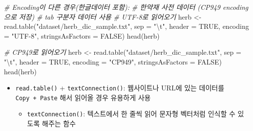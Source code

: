 \documentclass[
  11pt,
]{krantz}
\newenvironment{Shaded}{\begin{snugshade}}{\end{snugshade}}
\newcommand{\AttributeTok}[1]{\textcolor[rgb]{0.61,0.61,0.61}{#1}}
\newcommand{\CommentTok}[1]{\textcolor[rgb]{0.37,0.37,0.37}{\textit{#1}}}
\newcommand{\ConstantTok}[1]{\textcolor[rgb]{0,0,0}{#1}}
\newcommand{\FunctionTok}[1]{\textcolor[rgb]{0,0,0}{#1}}
\newcommand{\NormalTok}[1]{#1}
\newcommand{\OtherTok}[1]{\textcolor[rgb]{0.37,0.37,0.37}{#1}}
\newcommand{\SpecialCharTok}[1]{\textcolor[rgb]{0,0,0}{#1}}
\newcommand{\StringTok}[1]{\textcolor[rgb]{0.5,0.5,0.5}{#1}}
\providecommand{\tightlist}{%
  \setlength{\itemsep}{0pt}\setlength{\parskip}{0pt}}
\begin{document}
\footnotesize

\begin{Shaded}
\begin{Highlighting}[]
\CommentTok{\# Encoding이 다른 경우(한글데이터 포함): }
\CommentTok{\# 한약재 사전 데이터 (CP949 encoding으로 저장)}
\CommentTok{\# tab 구분자 데이터 사용}
\CommentTok{\# UTF{-}8로 읽어오기}
\NormalTok{herb }\OtherTok{\textless{}{-}} \FunctionTok{read.table}\NormalTok{(}\StringTok{"dataset/herb\_dic\_sample.txt"}\NormalTok{, }\AttributeTok{sep =} \StringTok{"}\SpecialCharTok{\textbackslash{}t}\StringTok{"}\NormalTok{, }
                   \AttributeTok{header =} \ConstantTok{TRUE}\NormalTok{, }
                   \AttributeTok{encoding =} \StringTok{"UTF{-}8"}\NormalTok{, }
                   \AttributeTok{stringsAsFactors =} \ConstantTok{FALSE}\NormalTok{)}
\FunctionTok{head}\NormalTok{(herb)}

\CommentTok{\# CP949로 읽어오기}
\NormalTok{herb }\OtherTok{\textless{}{-}} \FunctionTok{read.table}\NormalTok{(}\StringTok{"dataset/herb\_dic\_sample.txt"}\NormalTok{, }\AttributeTok{sep =} \StringTok{"}\SpecialCharTok{\textbackslash{}t}\StringTok{"}\NormalTok{, }
                   \AttributeTok{header =} \ConstantTok{TRUE}\NormalTok{, }
                   \AttributeTok{encoding =} \StringTok{"CP949"}\NormalTok{, }
                   \AttributeTok{stringsAsFactors =} \ConstantTok{FALSE}\NormalTok{)}
\FunctionTok{head}\NormalTok{(herb)}
\end{Highlighting}
\end{Shaded}

\normalsize

\begin{itemize}
\tightlist
\item
  \texttt{read.table()} + \texttt{textConnection()}: 웹사이트나 URL에 있는 데이터를 \texttt{Copy\ +\ Paste} 해서 읽어올 경우 유용하게 사용

  \begin{itemize}
  \tightlist
  \item
    \texttt{textConnection()}: 텍스트에서 한 줄씩 읽어 문자형 벡터처럼 인식할 수 있도록 해주는 함수
  \end{itemize}
\end{itemize}

\footnotesize
\end{document}
